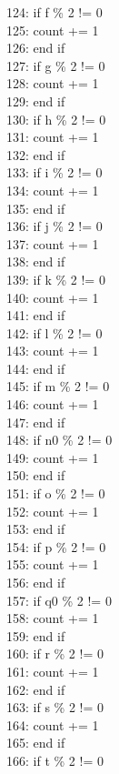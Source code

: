 \documentclass[a4paper]{book}
\theoremstyle{definition}
\begin{document}
{124: if f \% 2 != 0 \\
125: \indent count += 1 \\
126: end if \\
127: if g \% 2 != 0 \\
128: \indent count += 1 \\
129: end if \\
130: if h \% 2 != 0 \\
131: \indent count += 1 \\
132: end if \\
133: if i \% 2 != 0 \\
134: \indent count += 1 \\
135: end if \\
136: if j \% 2 != 0  \\
137: \indent count += 1 \\
138: end if \\
139: if k \% 2 != 0  \\
140: \indent count += 1 \\
141: end if \\
142: if l \% 2 != 0 \\
143: \indent count += 1 \\
144: end if \\
145: if m \% 2 != 0 \\
146: \indent count += 1 \\
147: end if \\
148: if n0 \% 2 != 0 \\
149: \indent count += 1 \\
150: end if \\
151: if o \% 2 != 0 \\
152: \indent count += 1 \\
153: end if \\
154: if p \% 2 != 0 \\
155: \indent count += 1 \\
156: end if \\
157: if q0 \% 2 != 0 \\
158: \indent count += 1 \\
159: end if \\
160: if r \% 2 != 0 \\
161: \indent count += 1 \\
162: end if \\
163: if s \% 2 != 0 \\
164: \indent count += 1 \\
165: end if \\
166: if t \% 2 != 0 \\
}
\end{document}
